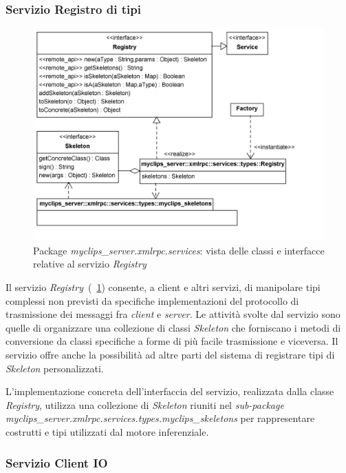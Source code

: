 \subsubsection{Servizio Registro di tipi}

\begin{figure}[h]
\centering
\includegraphics[width=1\textwidth]{Immagini/Capitolo3/Classi/myclips_server_services_Registry.png}
\caption{Package \emph{myclips\_server.xmlrpc.services}: vista delle classi e interfacce relative al servizio \emph{Registry}}\label{fig:class-myclips-server-services-registry}
\end{figure}

Il servizio \emph{Registry}~(\figurename~\ref{fig:class-myclips-server-services-registry}) consente, a client e altri servizi, di manipolare tipi complessi non previsti da specifiche implementazioni del protocollo di trasmissione dei messaggi fra \emph{client} e \emph{server}. Le attività svolte dal servizio sono quelle di organizzare una collezione di classi \emph{Skeleton} che forniscano i metodi di conversione da classi specifiche a forme di più facile trasmissione e viceversa.
Il servizio offre anche la possibilità ad altre parti del sistema di registrare tipi di \emph{Skeleton} personalizzati.

L'implementazione concreta dell'interfaccia del servizio, realizzata dalla classe \emph{Registry}, utilizza una collezione di \emph{Skeleton} riuniti nel \emph{sub-package} \emph{myclips\_server.xmlrpc.services.types.myclips\_skeletons} per rappresentare costrutti e tipi utilizzati dal motore inferenziale.

\subsubsection{Servizio Client IO}

